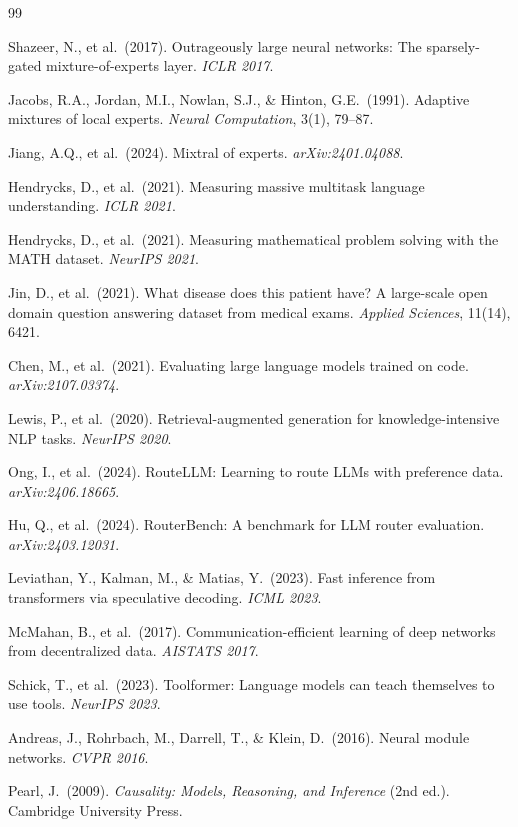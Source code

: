 \documentclass[12pt]{article}
\begin{document}
\begin{thebibliography}{99}

 Shazeer, N., et al.\ (2017). Outrageously large neural networks: The sparsely-gated mixture-of-experts layer. \textit{ICLR 2017}.

 Jacobs, R.A., Jordan, M.I., Nowlan, S.J., \& Hinton, G.E.\ (1991). Adaptive mixtures of local experts. \textit{Neural Computation}, 3(1), 79--87.

 Jiang, A.Q., et al.\ (2024). Mixtral of experts. \textit{arXiv:2401.04088}.

 Hendrycks, D., et al.\ (2021). Measuring massive multitask language understanding. \textit{ICLR 2021}.

 Hendrycks, D., et al.\ (2021). Measuring mathematical problem solving with the MATH dataset. \textit{NeurIPS 2021}.

 Jin, D., et al.\ (2021). What disease does this patient have? A large-scale open domain question answering dataset from medical exams. \textit{Applied Sciences}, 11(14), 6421.

 Chen, M., et al.\ (2021). Evaluating large language models trained on code. \textit{arXiv:2107.03374}.

 Lewis, P., et al.\ (2020). Retrieval-augmented generation for knowledge-intensive NLP tasks. \textit{NeurIPS 2020}.

 Ong, I., et al.\ (2024). RouteLLM: Learning to route LLMs with preference data. \textit{arXiv:2406.18665}.

 Hu, Q., et al.\ (2024). RouterBench: A benchmark for LLM router evaluation. \textit{arXiv:2403.12031}.

 Leviathan, Y., Kalman, M., \& Matias, Y.\ (2023). Fast inference from transformers via speculative decoding. \textit{ICML 2023}.

 McMahan, B., et al.\ (2017). Communication-efficient learning of deep networks from decentralized data. \textit{AISTATS 2017}.

 Schick, T., et al.\ (2023). Toolformer: Language models can teach themselves to use tools. \textit{NeurIPS 2023}.

 Andreas, J., Rohrbach, M., Darrell, T., \& Klein, D.\ (2016). Neural module networks. \textit{CVPR 2016}.

 Pearl, J.\ (2009). \textit{Causality: Models, Reasoning, and Inference} (2nd ed.). Cambridge University Press.

\end{thebibliography}
\end{document}
